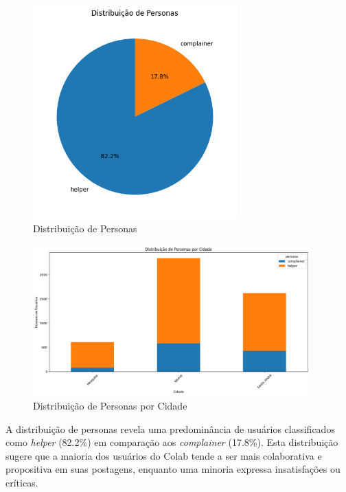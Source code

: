 \begin{figure}[htb]
    \centering
    \includegraphics[width=0.7\textwidth]{images/personas_pie.png}
    \caption{Distribuição de Personas}
    \label{fig:personas_pie}
\end{figure}

\begin{figure}[htb]
    \centering
    \includegraphics[width=0.95\textwidth]{images/personas_city.png}
    \caption{Distribuição de Personas por Cidade}
    \label{fig:personas_city}
\end{figure}

A distribuição de personas revela uma predominância de usuários classificados como \textit{helper} (82.2\%) em comparação aos \textit{complainer} (17.8\%). Esta distribuição sugere que a maioria dos usuários do Colab tende a ser mais colaborativa e propositiva em suas postagens, enquanto uma minoria expressa insatisfações ou críticas. 

